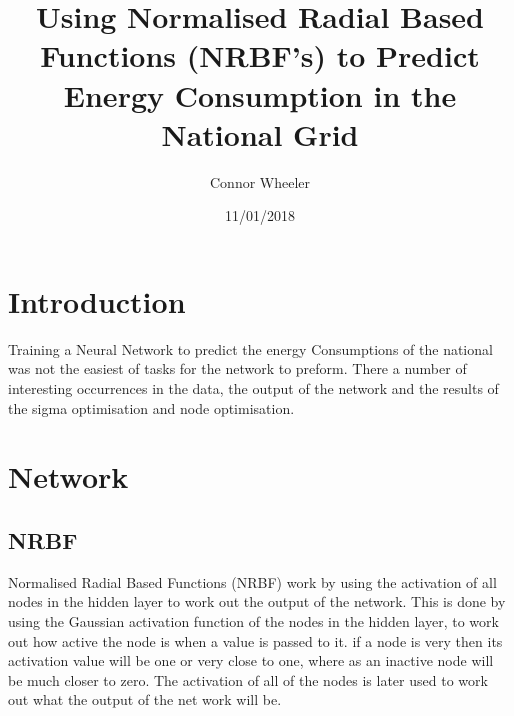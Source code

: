 \documentclass{IEEEtran}
\title{Using Normalised Radial Based Functions (NRBF's) to Predict Energy Consumption in the National Grid}
\author{Connor Wheeler}
\date{11/01/2018}
\begin{document}

\maketitle

\newpage
\section{Introduction}
\begin{flushleft}
    Training a Neural Network to predict the energy Consumptions of the national was not the easiest of tasks
    for the network to preform. There a number of interesting occurrences in the data, the output of the network and
    the results of the sigma optimisation and node optimisation.
\end{flushleft}
\section{Network}
\subsection{NRBF}
\begin{flushleft}
  Normalised Radial Based Functions (NRBF) work by using the activation of all nodes in the hidden
  layer to work out the output of the network. This is done by using the Gaussian activation function
  of the nodes in the hidden layer, to work out how active the node is when a value is passed to it.
  if a node is very then its activation value will be one or very close to one, where as an inactive
  node will be much closer to zero. The activation of all of the nodes is later used to work out what
  the output of the net work will be.
\end{flushleft}
\end{document}
